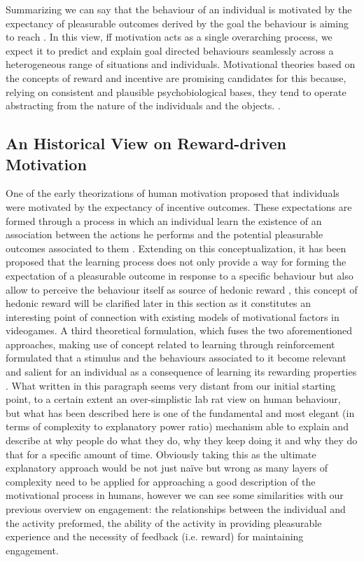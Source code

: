 
Summarizing we can say that the behaviour of an individual is motivated by the expectancy of pleasurable outcomes derived by the goal the behaviour is aiming to reach \cite{berridge2004motivation}. In this view, ff motivation acts as a single overarching process, we expect it to predict and explain goal directed behaviours seamlessly across a heterogeneous range of situations and individuals. Motivational theories based on the concepts of reward and incentive are promising candidates for this because, relying on consistent and plausible psychobiological bases, they tend to operate abstracting from the nature of the individuals and the objects. \cite{ikemoto1999role,berridge1998role,salamone2002motivational,berridge2004motivation,armony2013cambridge,corbit2015learning}.

\subsection{An Historical View on Reward-driven Motivation}
\label{motivation_hist}
One of the early theorizations of human motivation proposed that individuals were motivated by the expectancy of incentive outcomes. These expectations are formed through a process in which an individual learn the existence of an association between the actions he performs and the potential pleasurable outcomes associated to them \cite{berridge2004motivation}. Extending on this conceptualization, it has been proposed that the learning process does not only provide a way for forming the expectation of a pleasurable outcome in response to a specific behaviour but also allow to perceive the behaviour itself as source of hedonic reward \cite{berridge2004motivation}, this concept of hedonic reward will be clarified later in this section as it constitutes an interesting point of connection with existing models of motivational factors in videogames. A third theoretical formulation, which fuses the two aforementioned approaches, making use of  concept related to learning through reinforcement formulated that a stimulus and the behaviours associated to it become relevant and salient for an individual as a consequence of learning its rewarding properties \cite{berridge2004motivation}. What written in this paragraph seems very distant from our initial starting point, to a certain extent an over-simplistic lab rat view on human behaviour, but what has been described here is one of the fundamental and most elegant (in terms of complexity to explanatory power ratio) mechanism able to explain and describe at why people do what they do, why they keep doing it and why they do that for a specific amount of time. Obviously taking this as the ultimate explanatory approach would be not just naïve but wrong as many layers of complexity need to be applied for approaching a good description of the motivational process in humans, however we can see some similarities with our previous overview on engagement: the relationships between the individual and the activity preformed, the ability of the activity in providing pleasurable experience and the necessity of feedback (i.e. reward) for maintaining engagement.

